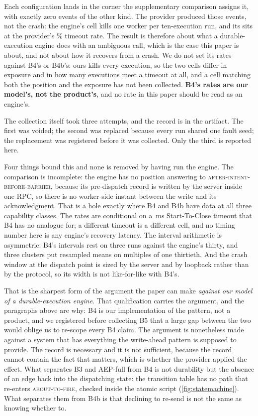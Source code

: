 Each configuration lands in the corner the supplementary comparison assigns
it, with exactly zero events of the other kind. The provider produced those
events, not the crash: the engine's cell kills one worker per ten-execution
run, and its \BfiveDup{} sits at the provider's \ProviderTimeoutPct{}\%
timeout rate. The result is therefore about what a durable-execution engine
does with an ambiguous call, which is the case this paper is about, and not
about how it recovers from a crash. We do not set its rates against B4's or
B4b's: ours kills every execution, so the two cells differ in exposure and in
how many executions meet a timeout at all, and a cell matching both the
position and the exposure has not been collected. \textbf{B4's rates are our
model's, not the product's}, and no rate in this paper should be read as an
engine's.

The collection itself took three attempts, and the record is in the
artifact. The first was voided; the second was replaced because every run
shared one fault seed; the replacement was registered before it was collected.
Only the third is reported here.

Four things bound this and none is removed by having run the engine. The
comparison is incomplete: the engine has no position answering to
\textsc{after-intent-before-barrier}, because its pre-dispatch record is written
by the server inside one RPC, so there is no worker-side instant between the
write and its acknowledgment. That is a hole exactly where B4 and B4b have
data at all three capability classes. The rates are conditional on a
\BfiveStartToClose{}\,ms Start-To-Close timeout that B4 has no analogue for; a
different timeout is a different cell, and no timing number here is any engine's
recovery latency. The interval arithmetic is asymmetric: B4's intervals rest
on three runs against the engine's thirty, and three clusters put resampled
means on multiples of one thirtieth. And the crash window at the dispatch point is sized by the
server and by loopback rather than by the protocol, so its width is not
like-for-like with B4's.

That is the sharpest form of the argument the paper can make \emph{against our
model of a durable-execution engine}. That qualification carries the argument, and
the paragraphs above are why: B4 is our implementation
of the pattern, not a product, and we registered before collecting B5 that a
large gap between the two would oblige us to re-scope every B4 claim. The
argument is nonetheless made against a system that has everything the
write-ahead pattern is supposed to provide. The record is necessary and it is
not sufficient, because the record cannot contain the fact that matters, which
is whether the provider applied the effect. What separates B3 and AEP-full from B4 is not durability but the
absence of an edge back into the dispatching state: the transition
table has no path that re-enters \textsc{about-to-fire}, checked inside the
atomic script (\cref{fig:statemachine}). What separates them from B4b is that
declining to re-send is not the same as knowing whether to.

